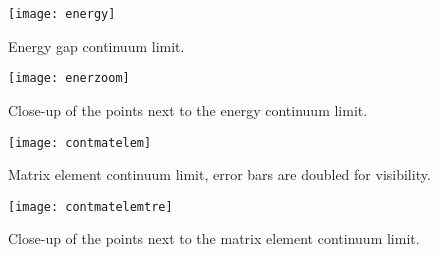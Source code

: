 \begin{figure}[H]
  \centering
  \texttt{[image: energy]}
  \caption{\label{fig:contenergy}Energy gap continuum limit.}
\end{figure}
\begin{figure}[H]
  \texttt{[image: enerzoom]}
  \caption{\label{fig:enerzoom}Close-up of the points next to the energy continuum limit.}
\end{figure}
\begin{figure}[H]
  \centering
  \texttt{[image: contmatelem]}
  \caption{\label{fig:contmatelem}Matrix element continuum limit, error bars are doubled for visibility.}
\end{figure}
\begin{figure}[H]
  \centering
  \texttt{[image: contmatelemtre]}
  \caption{\label{fig:matzoom} Close-up of the points next to the matrix element continuum limit.}
\end{figure}
